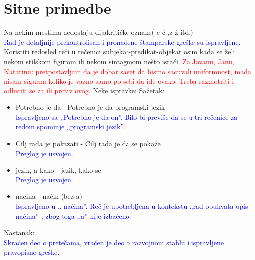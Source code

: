\documentclass[a4paper]{report}
\newcommand{\odgovor}[1]{\textcolor{black}{#1}}
\newcommand{\odgovorAutora}[1]{\textcolor{blue}{#1}}
\newcommand{\note}[1]{\textcolor{red}{#1}}
\begin{document}
\section{Sitne primedbe}
Na nekim mestima nedostaju dijakritičke oznake( c-ć ,z-ž itd.) \\
\odgovorAutora{Rad je detaljnije prekontrolisan i pronađene štamparske greške su ispravljene.} \\
Koristiti redosled reči u rečenici subjekat-predikat-objekat osim kada se želi nekom stilskom figurom ili nekom sintagmom nešto istaći.
\note{Za Jovanu, Janu, Katarinu: pretpostavljam da je dobar savet da bismo sacuvali uniformnost, mada nisam sigurna koliko je vazno samo po sebi da ide ovako. Treba razmotriti i odluciti se za ili protiv ovog.}\newline
Neke ispravke:\newline
Sažetak:
\begin{itemize}
  \item Potrebno je da - Potrebno je da programski jezik \\
  \odgovorAutora{Ispravljeno sa ,,Potrebno je da on''. Bilo bi previše da se u tri rečenice za redom spominje ,,programski jezik''.}
  \item Cilj rada je pokazati - Cilj rada je da se pokaže \\
  \odgovorAutora{Preglog je usvojen.}
  \item  jezik, a kako  -  jezik, kako se \\
  \odgovorAutora{Preglog je usvojen.}
  \item  nacina - način (bez a) \\
  \odgovorAutora{Ispravljeno u ,, načina''. Reč je upotrebljena u kontekstu ,,rad obuhvata opis načina'' , zbog toga ,,a'' nije izbačeno.}
\end{itemize}
Nastanak: \\
\odgovorAutora{Skraćen deo o pretečama, vraćen je deo o razvojnom stablu i ispravljene pravopisne greške.}
\end{document}
